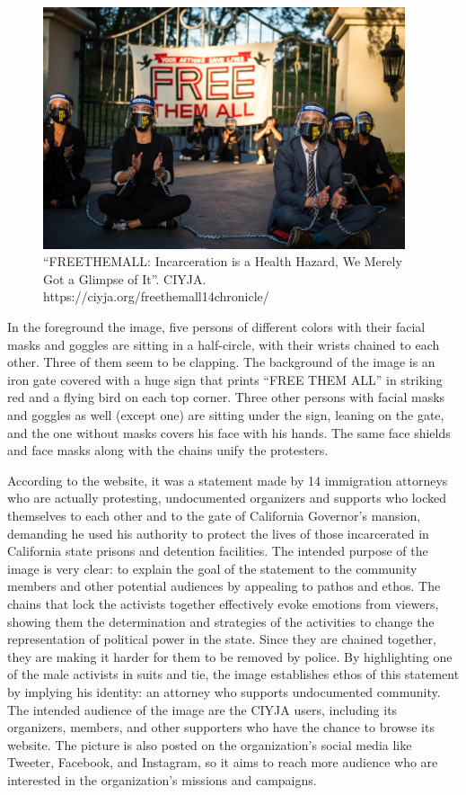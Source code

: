 \documentclass[12pt]{article}
\begin{document}
\begin{flushleft}
\newpage
\begin{figure}[h]
    \includegraphics[width=0.95\textwidth]{./Figure1.png}
    \caption{``FREETHEMALL: Incarceration is a Health Hazard, We Merely Got a Glimpse of It''. CIYJA. https://ciyja.org/freethemall14chronicle/}
    \label{Figure 1}
\end{figure}

In the foreground the image, five persons of different colors with their facial masks and goggles are sitting in a half-circle, with their wrists chained to each other. Three of them seem to be clapping. The background of the image is an iron gate covered with a huge sign that prints ``FREE THEM ALL'' in striking red and a flying bird on each top corner. Three other persons with facial masks and goggles as well (except one) are sitting under the sign, leaning on the gate, and the one without masks covers his face with his hands. The same face shields and face masks along with the chains unify the protesters. 

According to the website, it was a statement made by 14 immigration attorneys who are actually protesting, undocumented organizers and supports who locked themselves to each other and to the gate of California Governor's mansion, demanding he used his authority to protect the lives of those incarcerated in California state prisons and detention facilities. The intended purpose of the image is very clear: to explain the goal of the statement to the community members and other potential audiences by appealing to pathos and ethos. The chains that lock the activists together effectively evoke emotions from viewers, showing them the determination and strategies of the activities to change the representation of political power in the state. Since they are chained together, they are making it harder for them to be removed by police. By highlighting one of the male activists in suits and tie, the image establishes ethos of this statement by implying his identity: an attorney who supports undocumented community. The intended audience of the image are the CIYJA users, including its organizers, members, and other supporters who have the chance to browse its website. The picture is also posted on the organization's social media like Tweeter, Facebook, and Instagram, so it aims to reach more audience who are interested in the organization's missions and campaigns. 


\end{flushleft}
\end{document}
